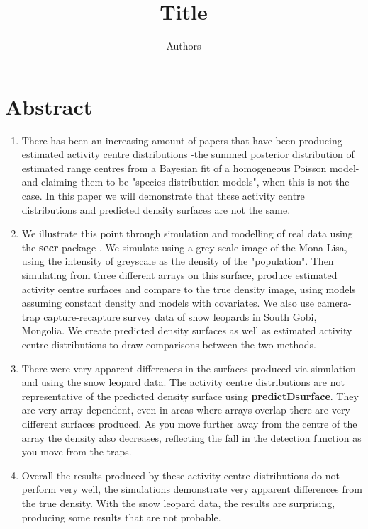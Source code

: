 \documentclass[a4paper,12pt]{article}
\begin{document}
\title{Title}
\author{Authors}
\maketitle

\section{Abstract}
\begin{enumerate}
\item There has been an increasing amount of papers that have been producing estimated activity centre distributions -the summed posterior distribution of estimated range centres from a Bayesian fit of a homogeneous Poisson model- and claiming them to be "species distribution models", when this is not the case. In this paper we will demonstrate that these activity centre distributions and predicted density surfaces are not the same.
\item We illustrate this point through simulation and modelling of real data using the \textbf{secr} package \citep*{Efford}. We simulate using a grey scale image of the Mona Lisa, using the intensity of greyscale as the density of the "population". Then simulating from three different arrays on this surface, produce estimated activity centre surfaces and compare to the true density image, using models assuming constant density and models with covariates. We also use camera-trap capture-recapture survey data of snow leopards in South Gobi, Mongolia.  We create predicted density surfaces as well as estimated activity centre distributions to draw comparisons between the two methods.
\item There were very apparent differences in the surfaces produced via simulation and using the snow leopard data. The activity centre distributions are not representative of the predicted density surface using \textbf{predictDsurface}. They are very array dependent, even in areas where arrays overlap there are very different surfaces produced. As you move further away from the centre of the array the density also decreases, reflecting the fall in the detection function as you move from the traps.
\item Overall the results produced by these activity centre distributions do not perform very well, the simulations demonstrate very apparent differences from the true density. With the snow leopard data, the results are surprising, producing some results that are not probable.
\end{enumerate}
\end{document}
